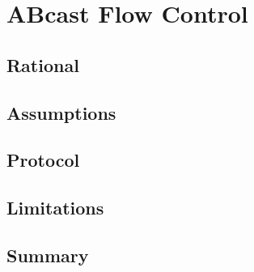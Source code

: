 \chapter{ABcast Flow Control}

    \graphicspath{{Chapter4/Figs/Vector/}{Chapter4/Figs/}}


\section{Rational}

\section{Assumptions}


\section{Protocol}

\section{Limitations}

\section{Summary}